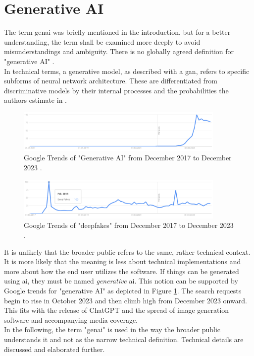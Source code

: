 \documentclass[
  a4paper,  %
  twoside,  %
  bibliography=totoc,
  headsepline,
  cleardoublepage=empty,
  parskip=half,
  draft=false
]{scrbook}
\begin{document}
\section{Generative AI}
\label{sec:genai}
The term \gls{genai} was briefly mentioned in the introduction, but for a better understanding, the term shall be examined more deeply to avoid misunderstandings and ambiguity. There is no globally agreed definition for "generative AI" \cite{garcia-penalvoWhatWeMean2023}. \\
In technical terms, a generative model, as described with a \gls{gan}, refers to specific subforms of neural network architecture. These are differentiated from discriminative models by their internal processes and the probabilities the authors estimate \cite{garcia-penalvoWhatWeMean2023} in \cite{gmComprehensiveSurveyAnalysis2020}.

\begin{figure}[h]
  \centering
  \includegraphics[width=0.9\textwidth]{./graphics/gtrends_genAI_1712-2312.png}
  \caption{Google Trends of "Generative AI" from December 2017 to December 2023 \cite{googletrendsGoogleTrendsQuery}.}
  \label{fig:gtrend-genai}
\end{figure}
\begin{figure}[h]
  \centering
  \includegraphics[width=0.9\textwidth]{./graphics/gtrends_deepfake_1712-2312.png}
  \caption{Google Trends of "deepfakes" from December 2017 to December 2023 \cite{googletrendsGoogleTrendsQuerya}.}
  \label{fig:gtrend-deepfakes}
\end{figure}

It is unlikely that the broader public refers to the same, rather technical context. It is more likely that the meaning is less about technical implementations and more about how the end user utilizes the software. If things can be generated using \gls{ai}, they must be named \textit{generative} \gls{ai}. This notion can be supported by Google trends for "generative AI" as depicted in Figure \ref{fig:gtrend-genai}. The search requests begin to rise in October 2023 and then climb high from December 2023 onward. This fits with the release of ChatGPT and the spread of image generation software and accompanying media coverage. \\
In the following, the term "\gls{genai}" is used in the way the broader public understands it and not as the narrow technical definition. Technical details are discussed and elaborated further. 
\end{document}
